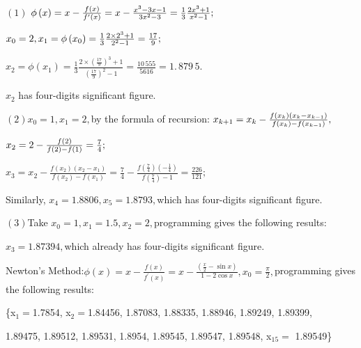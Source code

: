 \documentclass{article}
\begin{document}
$\left( 1\right) $ $\phi \left( x\right) =x-\frac{f\left( x\right) }{%
f^{\prime }\left( x\right) }=x-\frac{x^{3}-3x-1}{3x^{2}-3}=\allowbreak \frac{%
1}{3}\frac{2x^{3}+1}{x^{2}-1};$

$x_{0}=2,x_{1}=\phi \left( x_{0}\right) =\allowbreak \frac{1}{3}\frac{%
2\times 2^{3}+1}{2^{2}-1}=\allowbreak \frac{17}{9};$

$x_{2}=\phi \left( x_{1}\right) =\allowbreak \frac{1}{3}\frac{2\times \left( 
\frac{17}{9}\right) ^{3}+1}{\left( \frac{17}{9}\right) ^{2}-1}=\allowbreak 
\frac{10\,555}{5616}=\allowbreak 1.\,\allowbreak 879\,5.$

$x_{2}$ has four-digits significant figure.

$\left( 2\right) x_{0}=1,x_{1}=2,$by the formula of recursion: $%
x_{k+1}=x_{k}-\frac{f\left( x_{k}\right) \left( x_{k}-x_{k-1}\right) }{%
f\left( x_{k}\right) -f\left( x_{k-1}\right) },$

$x_{2}=2-\frac{f\left( 2\right) }{f\left( 2\right) -f\left( 1\right) }=\frac{%
7}{4};$

$x_{3}=x_{2}-\frac{f\left( x_{2}\right) \left( x_{2}-x_{1}\right) }{f\left(
x_{2}\right) -f\left( x_{1}\right) }=\frac{7}{4}-\frac{f\left( \frac{7}{4}%
\right) \left( -\frac{1}{4}\right) }{f\left( \frac{7}{4}\right) -1}=\frac{226%
}{121};$

Similarly, $x_{4}=1.8806,x_{5}=1.8793,$which has four-digits significant
figure.

$\left( 3\right) $Take $x_{0}=1,x_{1}=1.5,x_{2}=2,$programming gives the
following results:

$x_{3}=1.87394,$which already has four-digits significant figure.


Newton's Method:$\phi \left( x\right) =x-\frac{f\left( x\right) }{f^{\prime
}\left( x\right) }=x-\frac{\left( \frac{x}{2}-\sin x\right) }{1-2\cos x}%
,x_{0}=\frac{\pi }{2},$programming gives the following results:

\{x$_{1}=$1.7854, x$_{2}=$1.84456, 1.87083, 1.88335, 1.88946, 1.89249,
1.89399,

1.89475, 1.89512, 1.89531, 1.8954, 1.89545, 1.89547, 1.89548, x$_{15}=$%
1.89549\}
\end{document}

